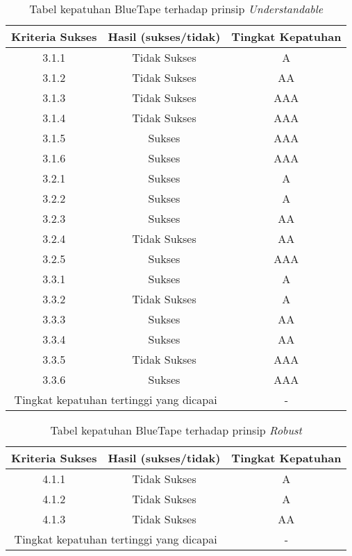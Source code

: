 \begin{table}[H]
    \centering 
    \caption{Tabel kepatuhan BlueTape terhadap prinsip \textit{Understandable}}
    \label{tab:kepatuhan_bluetape_understandable}
    \begin{tabular}{|c|c|c|}
        \toprule
        Kriteria Sukses & Hasil (sukses/tidak) & Tingkat Kepatuhan \\

        \midrule
        3.1.1 & Tidak Sukses & A \\
        3.1.2 & Tidak Sukses & AA \\
        3.1.3 & Tidak Sukses & AAA \\
        3.1.4 & Tidak Sukses & AAA \\
        3.1.5 & Sukses & AAA \\
        3.1.6 & Sukses & AAA \\
        3.2.1 & Sukses & A \\
        3.2.2 & Sukses & A \\
        3.2.3 & Sukses & AA \\
        3.2.4 & Tidak Sukses & AA \\
        3.2.5 & Sukses & AAA \\
        3.3.1 & Sukses & A \\
        3.3.2 & Tidak Sukses & A \\
        3.3.3 & Sukses & AA \\
        3.3.4 & Sukses & AA \\
        3.3.5 & Tidak Sukses & AAA \\
        3.3.6 & Sukses & AAA \\

        \bottomrule
        \multicolumn{2}{|c|}{Tingkat kepatuhan tertinggi yang dicapai} & - \\
        \bottomrule

    \end{tabular}
\end{table}
\begin{table}[H]
    \centering 
    \caption{Tabel kepatuhan BlueTape terhadap prinsip \textit{Robust}}
    \label{tab:kepatuhan_bluetape_robust}
    \begin{tabular}{|c|c|c|}
        \toprule
        Kriteria Sukses & Hasil (sukses/tidak) & Tingkat Kepatuhan\\

        \midrule
        4.1.1 & Tidak Sukses & A \\
        4.1.2 & Tidak Sukses & A \\
        4.1.3 & Tidak Sukses & AA \\

        \bottomrule
        \multicolumn{2}{|c|}{Tingkat kepatuhan tertinggi yang dicapai} & - \\
        \bottomrule

    \end{tabular} 
\end{table}

